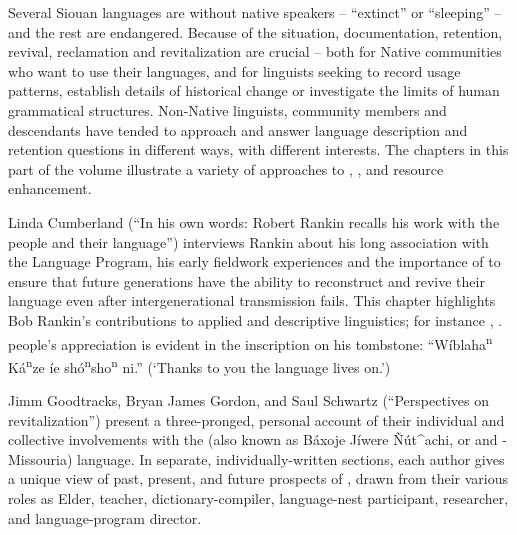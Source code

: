 \begin{refsection}

Several Siouan languages are without native speakers -- ``extinct'' or ``sleeping'' -- and the rest are endangered. Because of the situation, documentation, retention, revival, reclamation and revitalization are crucial -- both for Native communities who want to use their languages, and for linguists seeking to record usage patterns, establish details of historical change or investigate the limits of human grammatical structures. Non-Native linguists, community members and descendants have tended to approach and answer language description and retention questions in different ways, with different interests. The chapters in this part of the volume illustrate a variety of approaches to , , and resource enhancement.

Linda Cumberland (``In his own words: Robert Rankin recalls his work with the  people and their language'') interviews Rankin about his long association with the  Language Program, his early fieldwork experiences and the importance of  to ensure that future generations have the ability to reconstruct and revive their language even after intergenerational transmission fails. This chapter highlights Bob Rankin's contributions to applied and descriptive linguistics; for instance \citet{CumberlandRankin2012}, \citet{Rankin1989}.  people's appreciation is evident in the inscription on his tombstone: ``W\'iblaha\textsuperscript{n} K\'a\textsuperscript{n}ze \'ie sh\'o\textsuperscript{n}sho\textsuperscript{n} ni.'' (`Thanks to you the  language lives on.')

Jimm Goodtracks, Bryan James Gordon, and Saul Schwartz (``Perspectives on  revitalization'') present a three-pronged, personal account of their individual and collective involvements with the  (also known as Báxoje Jíwere \~{N}út\^{}achi, or  and -Missouria) language. In separate, individually-written sections, each author gives a unique view of past, present, and future prospects of , drawn from their various roles as Elder, teacher, dictionary-compiler, language-nest participant, researcher, and language-program director. 


\end{refsection}
